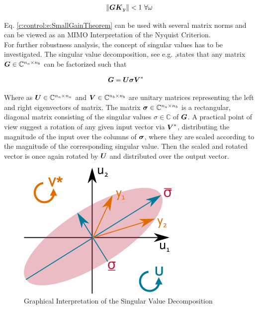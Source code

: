 \begin{align}
\lVert \mbox{\boldmath$G$} \mbox{\boldmath$K$}_y \rVert < 1 ~\forall \omega
\label{c:control:e:SmallGainTheorem}
\end{align}

Eq. \ref{c:control:e:SmallGainTheorem} can be used with several matrix norms and can be viewed as an MIMO Interpretation of the Nyquist Criterion. \\

For further robustness analysis, the concept of singular values has to be investigated. The singular value decomposition, see e.g. \cite[p.144 f.]{2013Springer-HandbuchIII},states that any matrix $\mbox{\boldmath$G$} \in \mathbb{C}^{n_a\times n_b}$ can be factorized such that

\begin{align}
\mbox{\boldmath$G$} &= \mbox{\boldmath$U$}\mbox{\boldmath$\sigma$}\mbox{\boldmath$V$}^*
\label{c:control:e:SVD}
\end{align}

Where as $\mbox{\boldmath$U$} \in \mathbb{C}^{n_a \times n_a}$ and $\mbox{\boldmath$V$} \in \mathbb{C}^{n_b \times n_b} $ are unitary matrices representing the left and right eigenvectors of matrix. The matrix $\mbox{\boldmath$\sigma$} \in \mathbb{C}^{n_a \times n_b}$ is a rectangular, diagonal matrix consisting of the singular values $\sigma \in \mathbb{C}$ of $\mbox{\boldmath$G$}$. A practical point of view suggest a rotation of any given input vector via $\mbox{\boldmath$V$}^*$, distributing the magnitude of the input over the columns of $\mbox{\boldmath$\sigma$}$, where they are scaled according to the magnitude of the corresponding singular value. Then the scaled and rotated vector is once again rotated by $\mbox{\boldmath$U$}$ and distributed over the output vector. \\

\begin{figure}[H]
\begin{minipage}[b]{\textwidth}
\centering
\includegraphics[scale=1]{./Graphics/SVD.png}
\caption{Graphical Interpretation of the Singular Value Decomposition}
\label{c:control:f:SVD}
\end{minipage}
\end{figure}



